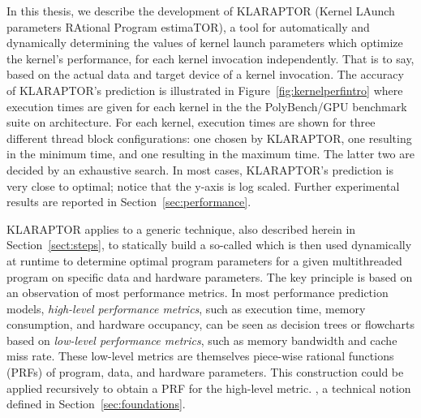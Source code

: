 In this thesis, we describe the development of KLARAPTOR (Kernel LAunch
parameters RAtional Program estimaTOR), a tool
for automatically and
dynamically determining the values of  {\cuda} kernel launch parameters which
optimize the kernel's performance, for each kernel invocation
independently.  That is to say, based on the actual data and target
device of a kernel invocation.
%
The accuracy of KLARAPTOR's prediction is illustrated in
Figure~\ref{fig:kernelperfintro} where execution times are given
for each kernel in the the PolyBench/GPU benchmark suite \cite{polybenchGPUweb}
on  architecture.
For each kernel, execution times are shown for 
three different thread block configurations:
one chosen by KLARAPTOR, 
one resulting in the minimum time, and one resulting in the maximum time.
The latter two are decided by an exhaustive search. 
In most cases, KLARAPTOR's prediction is very close to optimal; 
notice that the y-axis is log scaled.
Further experimental results are reported in Section~\ref{sec:performance}.



KLARAPTOR applies to {\cuda} a generic technique,
also described herein in Section~\ref{sect:steps}, 
to statically build a so-called 
which is then used dynamically at runtime to determine optimal program parameters
for a given multithreaded program on specific data and hardware parameters.
The key principle is based on an observation of most performance metrics.
In most performance prediction models, \textit{high-level performance metrics}, such
as execution time, memory consumption, and hardware occupancy, 
can be seen as decision trees or flowcharts
based on \textit{low-level performance metrics}, such as 
memory bandwidth and cache miss rate.
These low-level metrics are themselves
piece-wise rational functions (PRFs) of
program, data, and hardware parameters.
This construction could be applied
recursively to obtain a PRF for the high-level metric.
,
a technical notion defined in Section~\ref{sec:foundations}.

